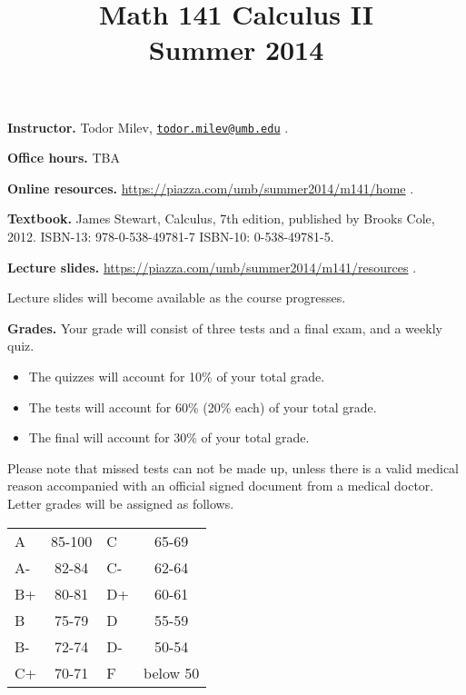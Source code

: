 \documentclass{article}
\title{Math 141 Calculus II \\ Summer 2014}
\begin{document}
\maketitle

\noindent \textbf{Instructor.} Todor Milev, \href{mailto:todor.milev@umb.edu}{\nolinkurl{todor.milev@umb.edu}} \quad \quad \quad .

\medskip
\noindent \textbf{Office hours. } TBA

\medskip
\noindent \textbf{Online resources. }  \url{https://piazza.com/umb/summer2014/m141/home}  \quad \quad \quad .


\medskip\noindent \textbf{Textbook. }  James Stewart, Calculus, 7th edition, published by Brooks Cole, 2012. ISBN-13: 978-0-538-49781-7
ISBN-10: 0-538-49781-5.

\medskip \noindent \textbf{Lecture slides. }  \url{https://piazza.com/umb/summer2014/m141/resources} \quad \quad \quad .

\medskip\noindent Lecture slides will become available as the course progresses.



\medskip
\noindent \textbf{Grades.} Your grade will consist of three tests and a final exam, and a weekly quiz. 
\begin{itemize}
\item The quizzes will account for 10\% of your total grade.
\item The tests will account for 60\% (20\% each) of your total grade.
\item The final will account for 30\% of your total grade.
\end{itemize}
Please note that missed tests can not be made up, unless there is a valid medical reason accompanied with an official signed document from a medical doctor. Letter grades will be assigned as follows. 

\begin{center}
\begin{tabular}{lc|lc}
A & 85-100 & C & 65-69 \\
A-& 82-84 & C- & 62-64 \\
B+& 80-81 & D+ & 60-61 \\
B & 75-79& D & 55-59\\
B-& 72-74& D- & 50-54\\
C+& 70-71& F & below 50\\
\end{tabular}

\end{center}
\end{document}
